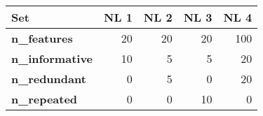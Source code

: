 \begin{tabular}{lrrrr}
\toprule
\textbf{Set} &  NL 1 &  NL 2 &  NL 3 &  NL 4 \\
\midrule
\textbf{n\_features   } &    20 &    20 &    20 &   100 \\
\textbf{n\_informative} &    10 &     5 &     5 &    20 \\
\textbf{n\_redundant  } &     0 &     5 &     0 &    20 \\
\textbf{n\_repeated   } &     0 &     0 &    10 &     0 \\
\bottomrule
\end{tabular}

